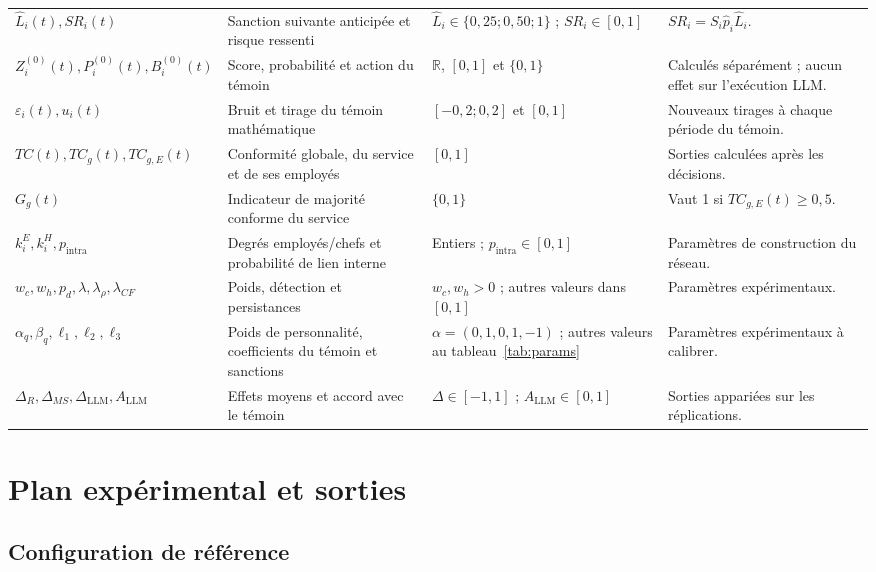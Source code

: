 \documentclass[10pt,a4paper]{article}
\renewcommand{\arraystretch}{1.12}
\begin{document}
\begin{longtable}{@{}L{27mm}L{48mm}L{38mm}L{44mm}@{}}
$\widehat L_i(t),SR_i(t)$ &
Sanction suivante anticipée et risque ressenti &
$\widehat L_i\in\{0{,}25;0{,}50;1\}$ ;
$SR_i\in[0,1]$ &
$SR_i=S_i\widehat p_i\widehat L_i$.\\
$Z_i^{(0)}(t),P_i^{(0)}(t),B_i^{(0)}(t)$ &
Score, probabilité et action du témoin &
$\mathbb R$, $[0,1]$ et $\{0,1\}$ &
Calculés séparément ; aucun effet sur l’exécution LLM.\\
$\varepsilon_i(t),u_i(t)$ &
Bruit et tirage du témoin mathématique &
$[-0{,}2;0{,}2]$ et $[0,1]$ &
Nouveaux tirages à chaque période du témoin.\\
{\scriptsize $TC(t),TC_g(t),TC_{g,E}(t)$} &
Conformité globale, du service et de ses employés &
$[0,1]$ &
Sorties calculées après les décisions.\\
$G_g(t)$ &
Indicateur de majorité conforme du service &
$\{0,1\}$ &
Vaut 1 si $TC_{g,E}(t)\geq0{,}5$.\\
$k_i^E,k_i^H,p_{\mathrm{intra}}$ &
Degrés employés/chefs et probabilité de lien interne &
Entiers ; $p_{\mathrm{intra}}\in[0,1]$ &
Paramètres de construction du réseau.\\
$w_c,w_h,p_d,\lambda,\lambda_\rho,\lambda_{CF}$ &
Poids, détection et persistances &
$w_c,w_h>0$ ; autres valeurs dans $[0,1]$ &
Paramètres expérimentaux.\\
$\alpha_q,\beta_q,\ell_1,\ell_2,\ell_3$ &
Poids de personnalité, coefficients du témoin et sanctions &
$\alpha=(0,1,0,1,-1)$ ; autres valeurs au
tableau~\ref{tab:params} &
Paramètres expérimentaux à calibrer.\\
$\Delta_R,\Delta_{MS},\Delta_{\mathrm{LLM}},A_{\mathrm{LLM}}$ &
Effets moyens et accord avec le témoin &
$\Delta\in[-1,1]$ ; $A_{\mathrm{LLM}}\in[0,1]$ &
Sorties appariées sur les réplications.\\
\end{longtable}
\normalsize
\renewcommand{\arraystretch}{1.12}

\section{Plan expérimental et sorties}

\subsection{Configuration de référence}
\end{document}

